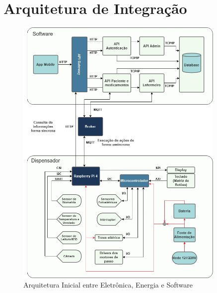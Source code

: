 
\section{Arquitetura de Integração}

\begin{figure}[H]
    \centering
    \includegraphics[width=0.9\textwidth]{figuras/diagrama_integracao_v2.png}
    \caption{Arquitetura Inicial entre Eletrônica, Energia e Software}
    \label{fig:fluxograma_integracao}
\end{figure}

